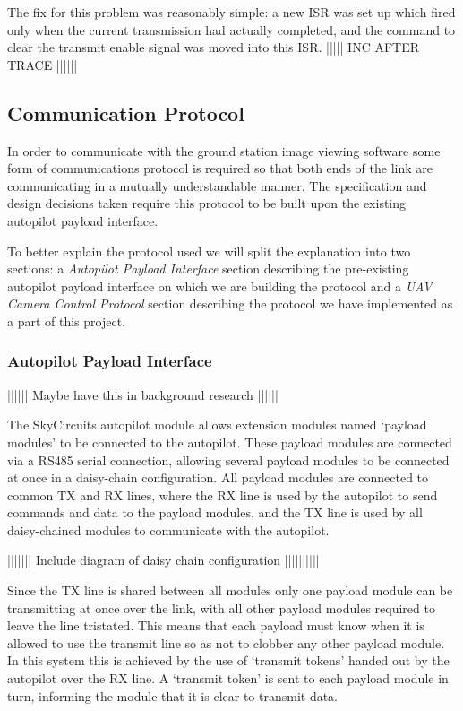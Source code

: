 The fix for this problem was reasonably simple: a new ISR was set up which 
fired only when the current transmission had actually completed, and the 
command to clear the transmit enable signal was moved into this ISR.
||||| INC AFTER TRACE ||||||


\subsection{Communication Protocol}
In order to communicate with the ground station image viewing software some
form of communications protocol is required so that both ends of the link 
are communicating in a mutually understandable manner. The specification and 
design decisions taken require this protocol to be built upon the existing
autopilot payload interface.

To better explain the protocol used we will split the explanation into two 
sections: a \emph{Autopilot Payload Interface} section describing the
pre-existing autopilot payload interface on which we are building the 
protocol and a \emph{UAV Camera Control Protocol} section describing the 
protocol we have implemented as a part of this project.

\subsubsection{Autopilot Payload Interface}
|||||| Maybe have this in background research ||||||

The SkyCircuits autopilot module allows extension modules named `payload 
modules' to be connected to the autopilot. These payload modules are connected 
via a RS485 serial connection, allowing several payload modules to be 
connected at once in a daisy-chain configuration. All payload modules are 
connected to common TX and RX lines, where the RX line is used by the
autopilot to send commands and data to the payload modules, and the TX
line is used by all daisy-chained modules to communicate with the autopilot.

||||||| Include diagram of daisy chain configuration ||||||||||

Since the TX line is shared between all modules only one payload module can be 
transmitting at once over the link, with all other payload modules required to
leave the line tristated. This means that each payload must know when it is
allowed to use the transmit line so as not to clobber any other payload module.
In this system this is achieved by the use of `transmit tokens' handed out 
by the autopilot over the RX line. A `transmit token' is sent to each payload 
module in turn, informing the module that it is clear to transmit data.

